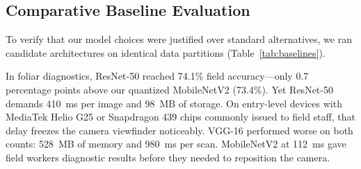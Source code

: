\documentclass[conference]{IEEEtran}
\begin{document}
\subsection{Comparative Baseline Evaluation}
To verify that our model choices were justified over standard alternatives, we ran candidate architectures on identical data partitions (Table~\ref{tab:baselines}).

\begin{table}[htbp]
\caption{Model Comparisons Across Identical Partitions}
\label{tab:baselines}
\centering
{}
\end{table}

In foliar diagnostics, ResNet-50 reached 74.1\% field accuracy---only 0.7 percentage points above our quantized MobileNetV2 (73.4\%). Yet ResNet-50 demands 410~ms per image and 98~MB of storage. On entry-level devices with MediaTek Helio G25 or Snapdragon 439 chips commonly issued to field staff, that delay freezes the camera viewfinder noticeably. VGG-16 performed worse on both counts: 528~MB of memory and 980~ms per scan. MobileNetV2 at 112~ms gave field workers diagnostic results before they needed to reposition the camera.
\end{document}
